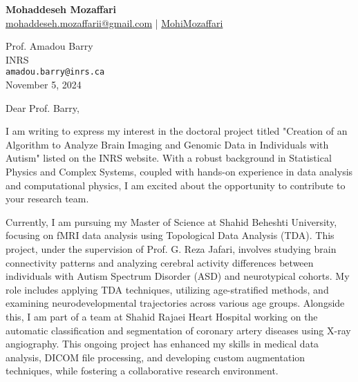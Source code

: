 \documentclass[letterpaper,11pt]{letter}
\begin{document}
\begin{center}
    \textbf{\Huge Mohaddeseh Mozaffari} \\
    \small{\href{mailto:mohaddeseh.mozaffarii@gmail.com}{ mohaddeseh.mozaffarii@gmail.com} | 	\href{https://www.linkedin.com/in/MohiMozaffari/}{ MohiMozaffari}}
\end{center}

\vspace{1em}

\begin{flushleft}
    Prof. Amadou Barry \\
    INRS \\
    \texttt{amadou.barry@inrs.ca} \\
    November 5, 2024
\end{flushleft}

\vspace{1em}

\begin{flushleft}
    Dear Prof. Barry,
\end{flushleft}

\vspace{1em}
I am writing to express my interest in the doctoral project titled "Creation of an Algorithm to Analyze Brain Imaging and Genomic Data in Individuals with Autism" listed on the INRS website. With a robust background in Statistical Physics and Complex Systems, coupled with hands-on experience in data analysis and computational physics, I am excited about the opportunity to contribute to your research team.

Currently, I am pursuing my Master of Science at Shahid Beheshti University, focusing on fMRI data analysis using Topological Data Analysis (TDA). This project, under the supervision of Prof. G. Reza Jafari, involves studying brain connectivity patterns and analyzing cerebral activity differences between individuals with Autism Spectrum Disorder (ASD) and neurotypical cohorts. My role includes applying TDA techniques, utilizing age-stratified methods, and examining neurodevelopmental trajectories across various age groups. Alongside this, I am part of a team at Shahid Rajaei Heart Hospital working on the automatic classification and segmentation of coronary artery diseases using X-ray angiography. This ongoing project has enhanced my skills in medical data analysis, DICOM file processing, and developing custom augmentation techniques, while fostering a collaborative research environment.
\end{document}
